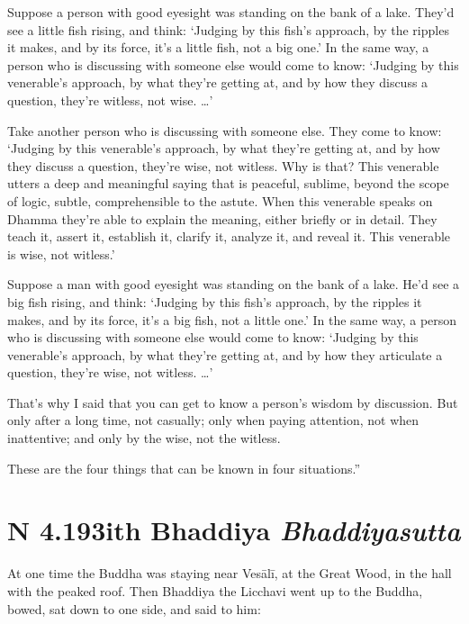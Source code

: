 \documentclass[12pt,openany]{book}%
\newcommand*{\suttatitleacronym}[1]{\smaller[2]{#1}\vspace*{.3em}}
\newcommand*{\suttatitletranslation}[1]{\linebreak{#1}}
\newcommand*{\suttatitleroot}[1]{\linebreak\smaller[2]\itshape{#1}}
\newcommand*{\tocacronym}[1]{\hspace*{-3.3em}{#1}\quad}
\newcommand*{\toctranslation}[1]{#1}
\newcommand*{\tocroot}[1]{(\textit{#1})}
\begin{document}
Suppose a person with good eyesight was standing on the bank of a lake. They’d see a little fish rising, and think: ‘Judging by this fish’s approach, by the ripples it makes, and by its force, it’s a little fish, not a big one.’ In the same way, a person who is discussing with someone else would come to know: ‘Judging by this venerable’s approach, by what they’re getting at, and by how they discuss a question, they’re witless, not wise. …’ 

Take another person who is discussing with someone else. They come to know: ‘Judging by this venerable’s approach, by what they’re getting at, and by how they discuss a question, they’re wise, not witless. Why is that? This venerable utters a deep and meaningful saying that is peaceful, sublime, beyond the scope of logic, subtle, comprehensible to the astute. When this venerable speaks on Dhamma they’re able to explain the meaning, either briefly or in detail. They teach it, assert it, establish it, clarify it, analyze it, and reveal it. This venerable is wise, not witless.’ 

Suppose a man with good eyesight was standing on the bank of a lake. He’d see a big fish rising, and think: ‘Judging by this fish’s approach, by the ripples it makes, and by its force, it’s a big fish, not a little one.’ In the same way, a person who is discussing with someone else would come to know: ‘Judging by this venerable’s approach, by what they’re getting at, and by how they articulate a question, they’re wise, not witless. …’ 

That’s why I said that you can get to know a person’s wisdom by discussion. But only after a long time, not casually; only when paying attention, not when inattentive; and only by the wise, not the witless. 

These are the four things that can be known in four situations.” 

%
\section*{{\suttatitleacronym AN 4.193}{\suttatitletranslation With Bhaddiya }{\suttatitleroot Bhaddiyasutta}}
\addcontentsline{toc}{section}{\tocacronym{AN 4.193} \toctranslation{With Bhaddiya } \tocroot{Bhaddiyasutta}}

At one time the Buddha was staying near \textsanskrit{Vesālī}, at the Great Wood, in the hall with the peaked roof. Then Bhaddiya the Licchavi went up to the Buddha, bowed, sat down to one side, and said to him: 
\end{document}
